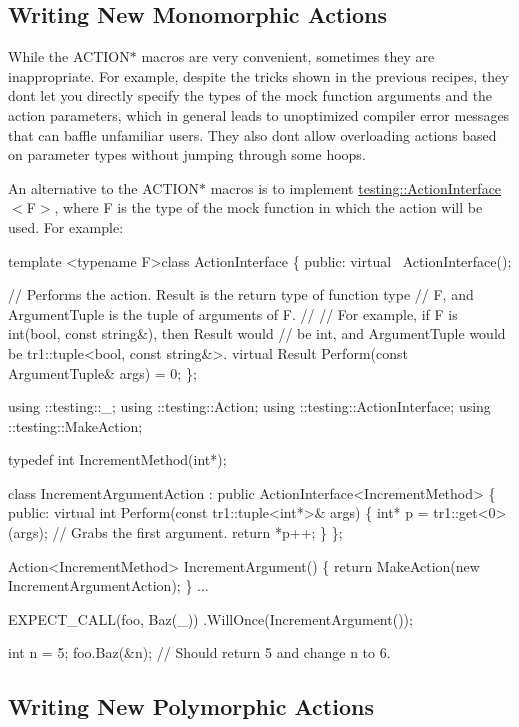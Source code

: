 \subsection*{Writing New Monomorphic Actions}

While the {\ttfamily A\+C\+T\+I\+O\+N$\ast$} macros are very convenient, sometimes they are inappropriate. For example, despite the tricks shown in the previous recipes, they don\textquotesingle{}t let you directly specify the types of the mock function arguments and the action parameters, which in general leads to unoptimized compiler error messages that can baffle unfamiliar users. They also don\textquotesingle{}t allow overloading actions based on parameter types without jumping through some hoops.

An alternative to the {\ttfamily A\+C\+T\+I\+O\+N$\ast$} macros is to implement {\ttfamily \hyperlink{classtesting_1_1_action_interface}{testing\+::\+Action\+Interface}$<$F$>$}, where {\ttfamily F} is the type of the mock function in which the action will be used. For example\+:


\begin{DoxyCode}
template <typename F>class ActionInterface \{
 public:
  virtual ~ActionInterface();

  // Performs the action.  Result is the return type of function type
  // F, and ArgumentTuple is the tuple of arguments of F.
  //
  // For example, if F is int(bool, const string&), then Result would
  // be int, and ArgumentTuple would be tr1::tuple<bool, const string&>.
  virtual Result Perform(const ArgumentTuple& args) = 0;
\};

using ::testing::\_;
using ::testing::Action;
using ::testing::ActionInterface;
using ::testing::MakeAction;

typedef int IncrementMethod(int*);

class IncrementArgumentAction : public ActionInterface<IncrementMethod> \{
 public:
  virtual int Perform(const tr1::tuple<int*>& args) \{
    int* p = tr1::get<0>(args);  // Grabs the first argument.
    return *p++;
  \}
\};

Action<IncrementMethod> IncrementArgument() \{
  return MakeAction(new IncrementArgumentAction);
\}
...

  EXPECT\_CALL(foo, Baz(\_))
      .WillOnce(IncrementArgument());

  int n = 5;
  foo.Baz(&n);  // Should return 5 and change n to 6.
\end{DoxyCode}


\subsection*{Writing New Polymorphic Actions}

